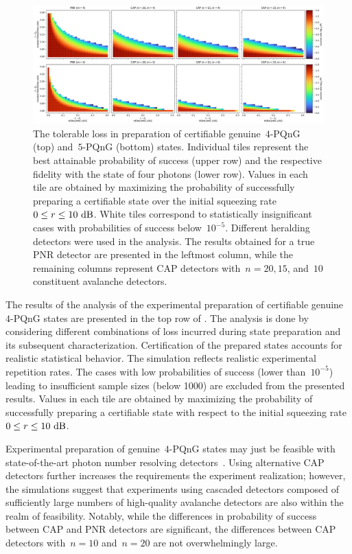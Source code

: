 \documentclass{article}
\begin{document}
\begin{figure}[h]
  \bgroup
    \hspace*{-0.125\columnwidth}%
    \includegraphics[width = 1.25 \columnwidth]{import/202504/paper_unified_merged_51-10dB.pdf}
  \egroup
  \caption{
    The tolerable loss in preparation of certifiable genuine~$4$-PQnG ({top}) and~$5$-PQnG ({bottom}) states. Individual tiles represent the best attainable probability of success (upper row) and the respective fidelity with the state of four photons (lower row). Values in each tile are obtained by maximizing the probability of successfully preparing a certifiable state over the initial squeezing rate~${0 \leq r \leq 10\ \mathrm{dB}}$. White tiles correspond to statistically insignificant cases with probabilities of success below~$10^{-5}$. Different heralding detectors were used in the analysis. The results obtained for a true PNR detector are presented in the leftmost column, while the remaining columns represent CAP detectors with~${n = 20, 15}$, and~$10$ constituent avalanche detectors.
  }
  \label{f-res-45}
\end{figure}

The results of the analysis of the experimental preparation of certifiable genuine~$4$-PQnG states are presented in the {top} row of . The analysis is done by considering different combinations of loss incurred during state preparation and its subsequent characterization. Certification of the prepared states accounts for realistic statistical behavior. The simulation reflects realistic experimental repetition rates. The cases with low probabilities of success (lower than~$10^{-5}$) leading to insufficient sample sizes (below 1000) are excluded from the presented results. Values in each tile are obtained by maximizing the probability of successfully preparing a certifiable state with respect to the initial squeezing rate~${0 \leq r \leq 10\ \mathrm{dB}}$.

Experimental preparation of genuine~$4$-PQnG states may just be feasible with state-of-the-art photon number resolving detectors~\cite{endo2021,endo2024}. Using alternative CAP detectors further increases the requirements  the experiment realization; however, the simulations suggest that experiments using cascaded detectors composed of sufficiently large numbers of high-quality avalanche detectors are also within the realm of feasibility. Notably, while the differences in probability of success between CAP and PNR detectors are significant, the differences between CAP detectors with~$n = 10$ and~$n = 20$ are not overwhelmingly large.
\end{document}
